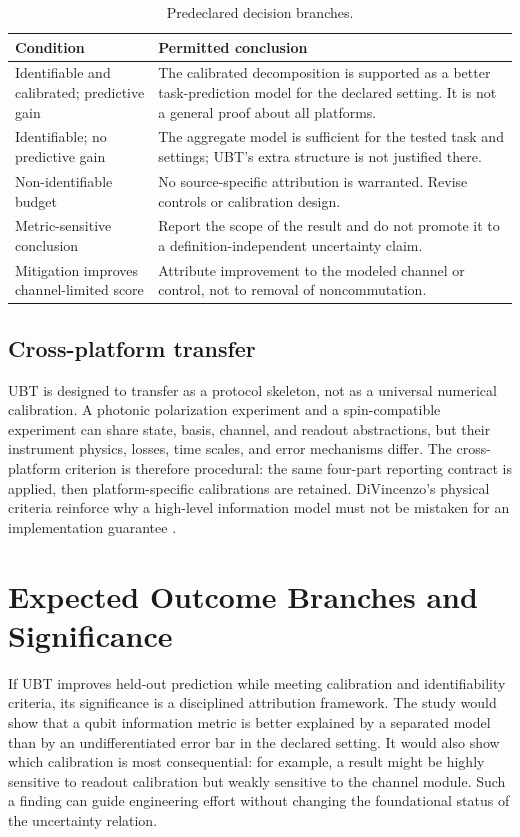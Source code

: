 \documentclass[conference]{../../../../Conference-LaTeX-template_10-17-19/IEEEtran}
\begin{document}
\begin{table}[!t]
\caption{Predeclared decision branches.}
\label{tab:branches}
\centering
\footnotesize
\begin{tabularx}{\columnwidth}{p{}Y}
\toprule
\textbf{Condition} & \textbf{Permitted conclusion}\\
\midrule
Identifiable and calibrated; predictive gain & The calibrated decomposition is supported as a better task-prediction model for the declared setting. It is not a general proof about all platforms. \\
Identifiable; no predictive gain & The aggregate model is sufficient for the tested task and settings; UBT's extra structure is not justified there. \\
Non-identifiable budget & No source-specific attribution is warranted. Revise controls or calibration design. \\
Metric-sensitive conclusion & Report the scope of the result and do not promote it to a definition-independent uncertainty claim. \\
Mitigation improves channel-limited score & Attribute improvement to the modeled channel or control, not to removal of noncommutation. \\
\bottomrule
\end{tabularx}
\end{table}

\subsection{Cross-platform transfer}

UBT is designed to transfer as a protocol skeleton, not as a universal numerical calibration. A photonic polarization experiment and a spin-compatible experiment can share state, basis, channel, and readout abstractions, but their instrument physics, losses, time scales, and error mechanisms differ. The cross-platform criterion is therefore procedural: the same four-part reporting contract is applied, then platform-specific calibrations are retained. DiVincenzo's physical criteria reinforce why a high-level information model must not be mistaken for an implementation guarantee \cite{divincenzo2000}.

\section{Expected Outcome Branches and Significance}

If UBT improves held-out prediction while meeting calibration and identifiability criteria, its significance is a disciplined attribution framework. The study would show that a qubit information metric is better explained by a separated model than by an undifferentiated error bar in the declared setting. It would also show which calibration is most consequential: for example, a result might be highly sensitive to readout calibration but weakly sensitive to the channel module. Such a finding can guide engineering effort without changing the foundational status of the uncertainty relation.
\end{document}
